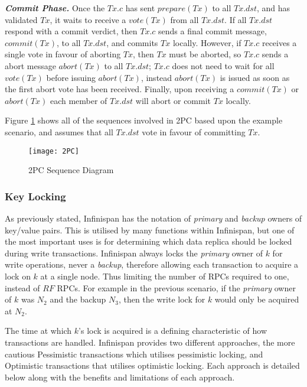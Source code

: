 	       \textbf{\emph{Commit Phase.}}  Once the $Tx.c$ has sent $prepare(Tx)$ to all $Tx.dst$, and has validated $Tx$, it waits to receive a $vote(Tx)$ from all $Tx.dst$.  If all $Tx.dst$ respond with a commit verdict, then $Tx.c$ sends a final commit message, $commit(Tx)$, to all $Tx.dst$, and commits $Tx$ locally.  However, if $Tx.c$ receives a single vote in favour of aborting $Tx$, then $Tx$ must be aborted, so $Tx.c$ sends a abort message $abort(Tx)$ to all $Tx.dst$; $Tx.c$ does not need to wait for all $vote(Tx)$ before issuing $abort(Tx)$, instead $abort(Tx)$ is issued as soon as the first abort vote has been received.  Finally, upon receiving a $commit(Tx)$ or $abort(Tx)$ each member of $Tx.dst$ will abort or commit $Tx$ locally.  
	       
	       Figure \ref{fig:2PC} shows all of the sequences involved in 2PC based upon the example scenario, and assumes that all $Tx.dst$ vote in favour of committing $Tx$.  
	       	       
            \begin{figure}[htbp!] 
                \centering    
                \texttt{[image: 2PC]}
                \caption[Two-phase Commit Protocol]{2PC Sequence Diagram}
                \label{fig:2PC}
            \end{figure}
            
	        \subsubsection*{Key Locking}
	        As previously stated, Infinispan has the notation of \emph{primary} and \emph{backup} owners of key/value pairs.  This is utilised by many functions within Infinispan, but one of the most important uses is for determining which data replica should be locked during write transactions.  Infinispan always locks the \emph{primary} owner of $k$ for write operations, never a \emph{backup}, therefore allowing each transaction to acquire a lock on $k$ at a single node.  Thus limiting the number of RPCs required to one, instead of $RF$ RPCs. For example in the previous scenario, if the \emph{primary} owner of $k$ was $N_2$ and the backup $N_3$, then the write lock for $k$ would only be acquired at $N_2$.  
	        
	        The time at which $k$'s lock is acquired is a defining characteristic of how transactions are handled.  Infinispan provides two different approaches, the more cautious Pessimistic transactions which utilises pessimistic locking, and Optimistic transactions that utilises optimistic locking.  Each approach is detailed below along with the benefits and limitations of each approach.  
	         

